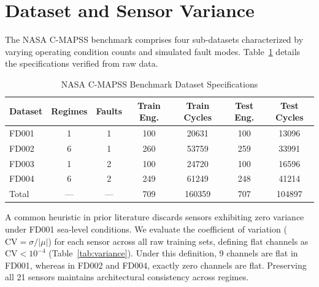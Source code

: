 \documentclass[conference]{IEEEtran}
\begin{document}
\section{Dataset and Sensor Variance}
The NASA C-MAPSS benchmark comprises four sub-datasets characterized by varying operating condition counts and simulated fault modes. Table~\ref{tab:dataset} details the specifications verified from raw data.

\begin{table}[htbp]
\caption{NASA C-MAPSS Benchmark Dataset Specifications}
\label{tab:dataset}
\centering
\begin{tabular}{lcccccc}
\toprule
Dataset & Regimes & Faults & Train Eng. & Train Cycles & Test Eng. & Test Cycles \\
\midrule
FD001 & 1 & 1 & 100 & 20631 & 100 & 13096 \\
FD002 & 6 & 1 & 260 & 53759 & 259 & 33991 \\
FD003 & 1 & 2 & 100 & 24720 & 100 & 16596 \\
FD004 & 6 & 2 & 249 & 61249 & 248 & 41214 \\
\midrule
Total & — & — & 709 & 160359 & 707 & 104897 \\
\bottomrule
\end{tabular}
\end{table}

A common heuristic in prior literature discards sensors exhibiting zero variance under FD001 sea-level conditions. We evaluate the coefficient of variation ($\text{CV} = \sigma / |\mu|$) for each sensor across all raw training sets, defining flat channels as $\text{CV} < 10^{-4}$ (Table~\ref{tab:variance}). Under this definition, 9 channels are flat in FD001, whereas in FD002 and FD004, exactly zero channels are flat. Preserving all 21 sensors maintains architectural consistency across regimes.
\end{document}
